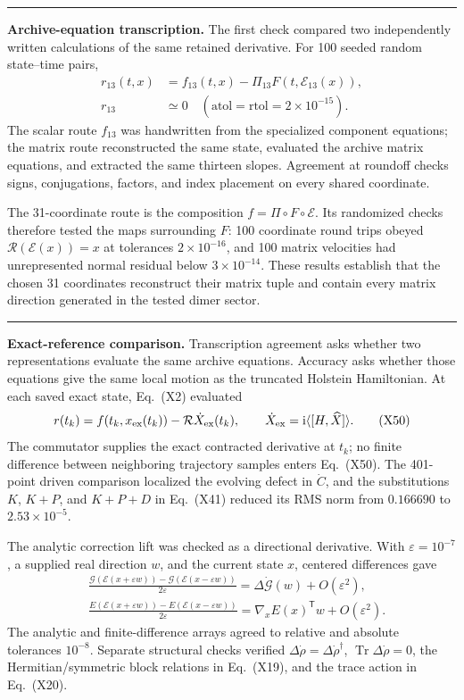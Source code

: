 \documentclass[10pt,letterpaper,twocolumn]{article}
\newcommand{\ii}{\mathrm i}
\newcommand{\segmenthead}[1]{%
  \Needspace{5\baselineskip}%
  \par\medskip{\color{navy}\large\bfseries #1}\par
  \vspace{-2pt}{\color{navy}\rule{\columnwidth}{0.7pt}}\par\smallskip
}
\newcommand{\conceptbreak}{%
  \par\medskip\noindent
  {\color{black!30}\rule{\columnwidth}{0.35pt}}%
  \par\medskip
}
\begin{document}
\conceptbreak
\textbf{Archive-equation transcription.}
The first check compared two independently written calculations of the same
retained derivative.  For 100 seeded random state--time pairs,
\[
\begin{aligned}
r_{13}(t,x)
&=f_{13}(t,x)-\Pi_{13}F(t,\mathcal E_{13}(x)),\\
r_{13}&\simeq0
\quad(\mathrm{atol}=\mathrm{rtol}=2\times10^{-15}).
\end{aligned}
\tag{X49}
\]
The scalar route \(f_{13}\) was handwritten from the specialized component
equations; the matrix route reconstructed the same state, evaluated the
archive matrix equations, and extracted the same thirteen slopes.  Agreement
at roundoff checks signs, conjugations, factors, and index placement on every
shared coordinate.

The 31-coordinate route is the composition
\(f=\Pi\circ F\circ\mathcal E\).  Its randomized checks therefore tested the
maps surrounding \(F\): 100 coordinate round trips obeyed
\(\mathcal R(\mathcal E(x))=x\) at tolerances
\(2\times10^{-16}\), and 100 matrix velocities had unrepresented normal
residual below \(3\times10^{-14}\).  These results establish that the chosen
31 coordinates reconstruct their matrix tuple and contain every matrix
direction generated in the tested dimer sector.

\conceptbreak
\textbf{Exact-reference comparison.}
Transcription agreement asks whether two representations evaluate the same
archive equations.  Accuracy asks whether those equations give the same local
motion as the truncated Holstein Hamiltonian.  At each saved exact state,
Eq.~(X2) evaluated
\[
r(t_k)=f(t_k,x_{\rm ex}(t_k))
-\mathcal R\dot X_{\rm ex}(t_k),
\qquad
\dot X_{\rm ex}=\ii\langle[H,\widehat X]\rangle .
\tag{X50}
\]
The commutator supplies the exact contracted derivative at \(t_k\); no
finite difference between neighboring trajectory samples enters Eq.~(X50).
The 401-point driven comparison localized the evolving defect in \(\dot C\),
and the substitutions \(K\), \(K+P\), and \(K+P+D\) in Eq.~(X41) reduced its
RMS norm from \(0.166690\) to \(2.53\times10^{-5}\).

\segmenthead{M. Lift, Optimizer, and Trajectory Checks}

The analytic correction lift was checked as a directional derivative.  With
\(\varepsilon=10^{-7}\), a supplied real direction \(w\), and the current
state \(x\), centered differences gave
{\small
\[
\begin{aligned}
&\frac{\mathcal G(\mathcal E(x+\varepsilon w))
-\mathcal G(\mathcal E(x-\varepsilon w))}{2\varepsilon}
=\Delta\dot{\mathcal G}(w)+O(\varepsilon^2),\\
&\frac{E(\mathcal E(x+\varepsilon w))
-E(\mathcal E(x-\varepsilon w))}{2\varepsilon}
=\nabla_xE(x)^{\mathsf T}w+O(\varepsilon^2).
\end{aligned}
\tag{X51}
\]
}
The analytic and finite-difference arrays agreed to relative and absolute
tolerances \(10^{-8}\).  Separate structural checks verified
\(\Delta\dot\rho=\Delta\dot\rho^\dagger\),
\(\operatorname{Tr}\Delta\dot\rho=0\), the Hermitian/symmetric block
relations in Eq.~(X19), and the trace action in Eq.~(X20).
\end{document}
